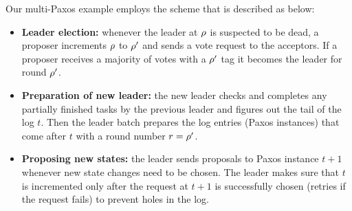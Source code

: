 Our multi-Paxos example employs the scheme that is described as below:
\begin{itemize}[leftmargin=*]
	\item {\textbf{Leader election: }} whenever the leader at $\rho$ is
		suspected to be dead, a proposer increments $\rho$ to $\rho'$ and
		sends a vote request to the acceptors.
		If a proposer receives a majority of votes with a $\rho'$ tag it
		becomes the leader for round $\rho'$.
	\item {\textbf{Preparation of new leader: }} the new leader checks and completes any
		partially finished tasks by the previous leader and figures out the
		tail of the log $t$. Then the leader batch prepares the log entries
		(Paxos instances) that come after $t$ with a round number $r = \rho'$.
	\item {\textbf{Proposing new states: }} the leader sends proposals
		to Paxos instance $t+1$ whenever new state changes need to be chosen.
		The leader makes sure that $t$ is incremented only after the
		request at $t+1$ is successfully chosen (retries if the
		request fails) to prevent holes in the log.
\end{itemize}


%
%
%

